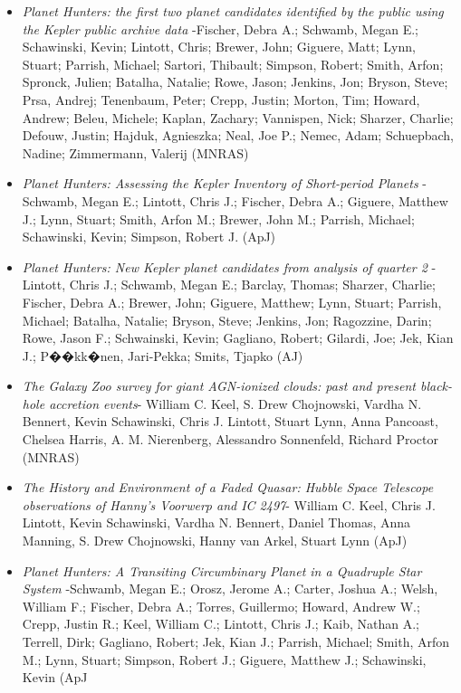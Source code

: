 \documentclass[10pt]{article}
\newenvironment{outerlist}[1][\enskip\textbullet]%
        {\begin{itemize}[#1]}{\end{itemize}%
         \vspace{-.6\baselineskip}}
\begin{document}
\begin{outerlist}
\item[] {\emph{Planet Hunters: the first two planet candidates identified by the public using the Kepler public archive data} -Fischer, Debra A.; Schwamb, Megan E.; Schawinski, Kevin; Lintott, Chris; Brewer, John; Giguere, Matt; Lynn, Stuart; Parrish, Michael; Sartori, Thibault; Simpson, Robert; Smith, Arfon; Spronck, Julien; Batalha, Natalie; Rowe, Jason; Jenkins, Jon; Bryson, Steve; Prsa, Andrej; Tenenbaum, Peter; Crepp, Justin; Morton, Tim; Howard, Andrew; Beleu, Michele; Kaplan, Zachary; Vannispen, Nick; Sharzer, Charlie; Defouw, Justin; Hajduk, Agnieszka; Neal, Joe P.; Nemec, Adam; Schuepbach, Nadine; Zimmermann, Valerij (MNRAS) }

\item[] {\emph{Planet Hunters: Assessing the Kepler Inventory of Short-period Planets} -Schwamb, Megan E.; Lintott, Chris J.; Fischer, Debra A.; Giguere, Matthew J.; Lynn, Stuart; Smith, Arfon M.; Brewer, John M.; Parrish, Michael; Schawinski, Kevin; Simpson, Robert J. (ApJ) }

\item[] {\emph{Planet Hunters: New Kepler planet candidates from analysis of quarter 2} -Lintott, Chris J.; Schwamb, Megan E.; Barclay, Thomas; Sharzer, Charlie; Fischer, Debra A.; Brewer, John; Giguere, Matthew; Lynn, Stuart; Parrish, Michael; Batalha, Natalie; Bryson, Steve; Jenkins, Jon; Ragozzine, Darin; Rowe, Jason F.; Schwainski, Kevin; Gagliano, Robert; Gilardi, Joe; Jek, Kian J.; P��kk�nen, Jari-Pekka; Smits, Tjapko (AJ) }

\item[] {\emph{The Galaxy Zoo survey for giant AGN-ionized clouds: past and present black-hole accretion events}- William C. Keel, S. Drew Chojnowski, Vardha N. Bennert, Kevin Schawinski, Chris J. Lintott, Stuart Lynn, Anna Pancoast, Chelsea Harris, A. M. Nierenberg, Alessandro Sonnenfeld, Richard Proctor (MNRAS)}

\item[] {\emph{The History and Environment of a Faded Quasar: Hubble Space Telescope observations of Hanny's Voorwerp and IC 2497}- William C. Keel, Chris J. Lintott, Kevin Schawinski, Vardha N. Bennert, Daniel Thomas, Anna Manning, S. Drew Chojnowski, Hanny van Arkel, Stuart Lynn (ApJ)}

\item[] {\emph{Planet Hunters: A Transiting Circumbinary Planet in a Quadruple Star System} -Schwamb, Megan E.; Orosz, Jerome A.; Carter, Joshua A.; Welsh, William F.; Fischer, Debra A.; Torres, Guillermo; Howard, Andrew W.; Crepp, Justin R.; Keel, William C.; Lintott, Chris J.; Kaib, Nathan A.; Terrell, Dirk; Gagliano, Robert; Jek, Kian J.; Parrish, Michael; Smith, Arfon M.; Lynn, Stuart; Simpson, Robert J.; Giguere, Matthew J.; Schawinski, Kevin (ApJ }


\end{outerlist}
\end{document}
